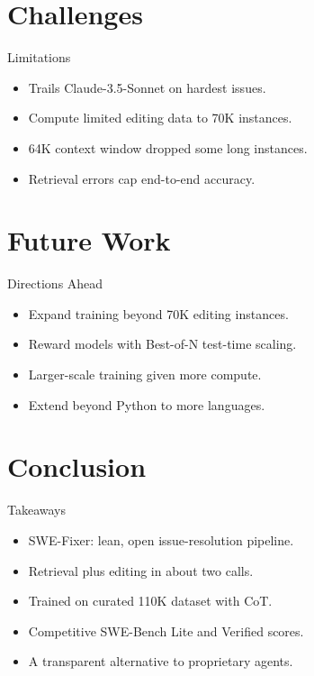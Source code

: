 \documentclass{beamer}
\begin{document}
\section{Challenges}
\begin{frame}{Limitations}
\begin{itemize}
\item Trails Claude-3.5-Sonnet on hardest issues.
\item Compute limited editing data to 70K instances.
\item 64K context window dropped some long instances.
\item Retrieval errors cap end-to-end accuracy.
\end{itemize}
\end{frame}

\section{Future Work}
\begin{frame}{Directions Ahead}
\begin{itemize}
\item Expand training beyond 70K editing instances.
\item Reward models with Best-of-N test-time scaling.
\item Larger-scale training given more compute.
\item Extend beyond Python to more languages.
\end{itemize}
\end{frame}

\section{Conclusion}
\begin{frame}{Takeaways}
\begin{itemize}
\item SWE-Fixer: lean, open issue-resolution pipeline.
\item Retrieval plus editing in about two calls.
\item Trained on curated 110K dataset with CoT.
\item Competitive SWE-Bench Lite and Verified scores.
\item A transparent alternative to proprietary agents.
\end{itemize}
\end{frame}
\end{document}
